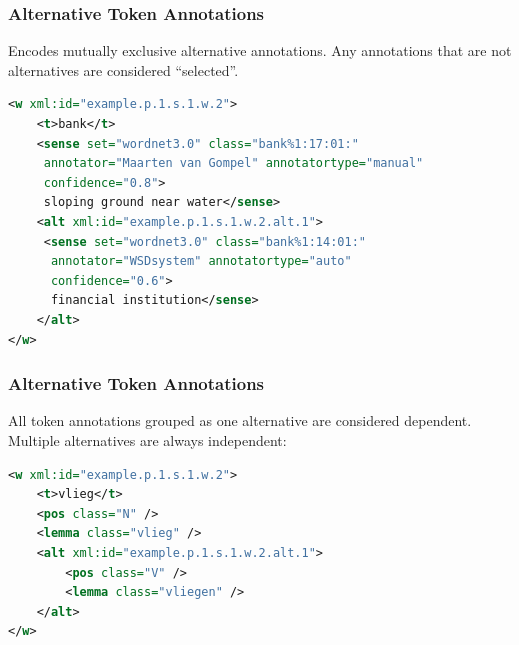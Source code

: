 \documentclass[compress,10pt]{beamer}
\begin{document}
\begin{frame}[fragile]
\frametitle{Alternative Token Annotations}

Encodes mutually exclusive alternative annotations. Any annotations that are not alternatives are considered ``selected''.

\begin{lstlisting}[language=xml]
<w xml:id="example.p.1.s.1.w.2">
    <t>bank</t>
    <sense set="wordnet3.0" class="bank%1:17:01:"    
     annotator="Maarten van Gompel" annotatortype="manual" 
     confidence="0.8">
     sloping ground near water</sense>
    <alt xml:id="example.p.1.s.1.w.2.alt.1">
     <sense set="wordnet3.0" class="bank%1:14:01:"
      annotator="WSDsystem" annotatortype="auto" 
      confidence="0.6">     
      financial institution</sense> 
    </alt>
</w>                         
\end{lstlisting}        

\end{frame}

\begin{frame}[fragile]
\frametitle{Alternative Token Annotations}

All token annotations grouped as one alternative are considered dependent. Multiple alternatives are always independent:

\begin{lstlisting}[language=xml]
<w xml:id="example.p.1.s.1.w.2">
    <t>vlieg</t>
    <pos class="N" />
    <lemma class="vlieg" />
    <alt xml:id="example.p.1.s.1.w.2.alt.1">
        <pos class="V" />
        <lemma class="vliegen" />
    </alt>
</w>                         
\end{lstlisting}        

\end{frame}
\end{document}

